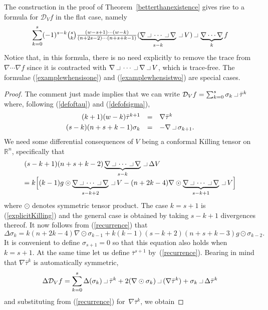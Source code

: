 \documentclass[a4paper,12pt]{amsart}
\newcommand{\intprod}{\makebox[10pt]{\rule{5pt}{.3pt}\rule{.3pt}{5pt}}}
\begin{document}
The construction in the proof of Theorem~\ref{betterthanexistence}
gives rise to a formula for ${\mathcal D}_Vf$ in the flat case, namely
$$\sum_{k=0}^s(-1)^{s-k}
\textstyle\binom{s}{k}\frac{(w-s+1)\cdots(w-k)}{(n+2s-2)\cdots(n+s+k-1)}
(\underbrace{\nabla\intprod\cdots\intprod\nabla}_{s-k}\intprod V)\intprod
 \underbrace{\nabla\cdots\nabla}_kf$$
Notice
that, in this formula, there is no need explicitly to remove the trace from
$\nabla\cdots\nabla f$ since it is contracted with
$\nabla\intprod\cdots\intprod\nabla\intprod V$, which is trace-free. The
formulae (\ref{examplewhensisone}) and (\ref{examplewhensistwo}) are special
cases.
\renewcommand{\proofname}{Alternative proof of Theorem~\ref{existence}}
\begin{proof}
The comment just made implies that we can write
${\mathcal D}_Vf=\sum_{k=0}^s\sigma_k\intprod\bar\tau^k$ where, following
(\ref{defoftau}) and (\ref{defofsigma}),
\begin{equation}\label{recurrence}
\begin{array}{rcl}(k+1)(w-k)\bar\tau^{k+1}&=&\nabla\bar\tau^k\\[3pt]
(s-k)(n+s+k-1)\sigma_k&=&-\nabla\intprod\sigma_{k+1}.
\end{array}\end{equation}
We need some differential consequences of $V$ being a conformal Killing
tensor on~${\mathbb R}^n$, specifically that
$$\begin{array}l(s-k+1)(n+s+k-2)
\underbrace{\nabla\intprod\cdots\intprod\nabla}_{s-k}\intprod\Delta V\\[5pt]
=k\Big[(k-1)g\odot
\underbrace{\nabla\intprod\cdots\intprod\nabla}_{s-k+2}\intprod V
-(n+2k-4)\nabla\odot
\underbrace{\nabla\intprod\cdots\intprod\nabla}_{s-k+1}\intprod V
\Big]\end{array}$$
where $\odot$ denotes symmetric tensor product. The case $k=s+1$ is
(\ref{explicitKilling}) and the general case is obtained by taking $s-k+1$
divergences thereof. It now follows from (\ref{recurrence}) that
$$\Delta\sigma_k=k(n+2k-4)\nabla\odot\sigma_{k-1}
+k(k-1)(s-k+2)(n+s+k-3)g\odot\sigma_{k-2}.$$
It is convenient to define $\sigma_{s+1}=0$ so that this equation also holds
when $k=s+1$. At the same time let us define $\bar\tau^{s+1}$
by~(\ref{recurrence}). Bearing in mind that $\nabla\bar\tau^k$ is
automatically symmetric,
$$\Delta{\mathcal D}_Vf=\sum_{k=0}^s\Delta(\sigma_k)\intprod\bar\tau^k
+2(\nabla\odot\sigma_k)\intprod(\nabla\bar\tau^k)
+\sigma_k\intprod\Delta\bar\tau^k$$
and
substituting from (\ref{recurrence}) for~$\nabla\bar\tau^k$, we obtain

\end{proof}
\end{document}
